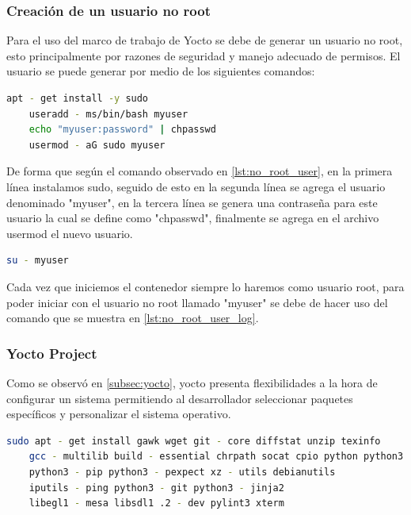 \subsubsection{Creación de un usuario no root}

Para el uso del marco de trabajo de Yocto se debe de generar un usuario no root, esto principalmente por razones de seguridad y manejo adecuado de permisos. El usuario se puede generar por medio de los siguientes comandos:

\begin{lstlisting}[language=bash, caption={Generacion de usuario no root, Linux}, label=lst:no_root_user]
    apt - get install -y sudo
    useradd - ms/bin/bash myuser
    echo "myuser:password" | chpasswd
    usermod - aG sudo myuser
\end{lstlisting}

De forma que según el comando observado en \ref{lst:no_root_user}, en la primera línea instalamos sudo, seguido de esto en la segunda línea se agrega el usuario denominado "myuser", en la tercera línea se genera una contraseña para este usuario la cual se define como "chpasswd", finalmente se agrega en el archivo usermod el nuevo usuario. 

\begin{lstlisting}[language=bash, caption={Iniciar usuario no root, Linux}, label=lst:no_root_user_log]
    su - myuser
\end{lstlisting}


Cada vez que iniciemos el contenedor siempre lo haremos como usuario root, para poder iniciar con el usuario no root llamado "myuser" se debe de hacer uso del comando que se muestra en \ref{lst:no_root_user_log}.

\subsubsection{Yocto Project}

Como se observó en \ref{subsec:yocto}, yocto presenta flexibilidades a la hora de configurar un sistema permitiendo al desarrollador seleccionar paquetes específicos y personalizar el sistema operativo.

\begin{lstlisting}[language=bash, caption={Requerimientos Yocto Zeus, Linux}, label=lst:yocto_requirements]
    sudo apt - get install gawk wget git - core diffstat unzip texinfo
    gcc - multilib build - essential chrpath socat cpio python python3
    python3 - pip python3 - pexpect xz - utils debianutils 
    iputils - ping python3 - git python3 - jinja2 
    libegl1 - mesa libsdl1 .2 - dev pylint3 xterm
\end{lstlisting}

